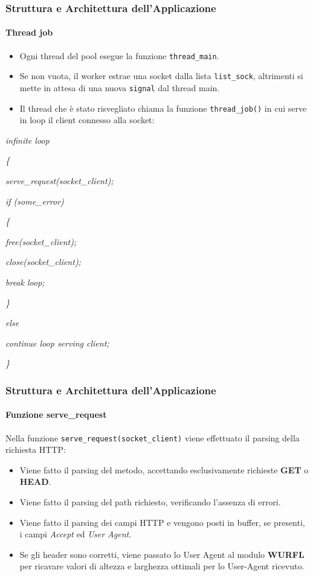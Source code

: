 \documentclass{beamer}
\begin{document}
\begin{frame}
\frametitle{Struttura e Architettura dell'Applicazione}
\framesubtitle{Thread job}

\begin{itemize}
\item Ogni thread del pool esegue la funzione \texttt{thread\_main}.
\item Se non vuota, il worker
estrae una socket dalla lista \texttt{list\_sock}, altrimenti si mette in attesa di una nuova
\texttt{signal} dal thread main.
\item   Il thread che è stato risvegliato chiama la funzione
\texttt{thread\_job()} in cui serve in loop il client connesso alla socket:
\end{itemize}

\medskip
\scriptsize
\setlength{\parindent}{30pt} \textit{infinite loop}

\setlength{\parindent}{32pt} \textit{\{}

\setlength{\parindent}{50pt} \textit{serve\_request(socket\_client);}

\setlength{\parindent}{50pt} \textit{if (some\_error)}

\setlength{\parindent}{52pt} \textit{\{}


\setlength{\parindent}{70pt} \textit{free(socket\_client);}

\setlength{\parindent}{70pt} \textit{close(socket\_client);}

\setlength{\parindent}{70pt} \textit{break loop;}


\setlength{\parindent}{52pt} \textit{\}}

\setlength{\parindent}{50pt} \textit{else}


\setlength{\parindent}{70pt} \textit{continue loop serving client;}

\setlength{\parindent}{32pt} \textit{\}}
\normalsize
\end{frame}

\begin{frame}
\frametitle{Struttura e Architettura dell'Applicazione}
\framesubtitle{Funzione serve\_request}

Nella funzione \texttt{serve\_request(socket\_client)} viene effettuato il parsing della richiesta HTTP:

\begin{itemize}
\item Viene fatto il parsing del metodo, accettando esclusivamente richieste \textbf{GET} o \textbf{HEAD}.
\item Viene fatto il parsing del path richiesto, verificando l'assenza di errori.
\item Viene fatto il parsing dei campi HTTP e vengono posti in buffer, se presenti, i campi \textit{Accept} ed \textit{User Agent}.
\item Se gli header sono corretti, viene passato lo User Agent al modulo
\textbf{WURFL} per ricavare
valori di altezza e larghezza ottimali per lo User-Agent ricevuto.
\end{itemize}

\end{frame}
\end{document}
